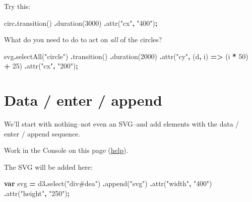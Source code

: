 \documentclass[
  openany]{book}
\newenvironment{Shaded}{\begin{snugshade}}{\end{snugshade}}
\newcommand{\DecValTok}[1]{\textcolor[rgb]{0.00,0.00,0.81}{#1}}
\newcommand{\FunctionTok}[1]{\textcolor[rgb]{0.00,0.00,0.00}{#1}}
\newcommand{\KeywordTok}[1]{\textcolor[rgb]{0.13,0.29,0.53}{\textbf{#1}}}
\newcommand{\NormalTok}[1]{#1}
\newcommand{\OperatorTok}[1]{\textcolor[rgb]{0.81,0.36,0.00}{\textbf{#1}}}
\newcommand{\StringTok}[1]{\textcolor[rgb]{0.31,0.60,0.02}{#1}}
\begin{document}
Try this:

\begin{Shaded}
\begin{Highlighting}[]
\NormalTok{circ}\OperatorTok{.}\FunctionTok{transition}\NormalTok{()}
  \OperatorTok{.}\FunctionTok{duration}\NormalTok{(}\DecValTok{3000}\NormalTok{)}
  \OperatorTok{.}\FunctionTok{attr}\NormalTok{(}\StringTok{"cx"}\OperatorTok{,} \StringTok{"400"}\NormalTok{)}\OperatorTok{;}
\end{Highlighting}
\end{Shaded}

What do you need to do to act on \emph{all} of the circles?

\begin{Shaded}
\begin{Highlighting}[]
\NormalTok{svg}\OperatorTok{.}\FunctionTok{selectAll}\NormalTok{(}\StringTok{"circle"}\NormalTok{)}
  \OperatorTok{.}\FunctionTok{transition}\NormalTok{()}
  \OperatorTok{.}\FunctionTok{duration}\NormalTok{(}\DecValTok{2000}\NormalTok{)}
  \OperatorTok{.}\FunctionTok{attr}\NormalTok{(}\StringTok{"cy"}\OperatorTok{,}\NormalTok{ (d}\OperatorTok{,}\NormalTok{ i) }\KeywordTok{=\textgreater{}}\NormalTok{ (i }\OperatorTok{*} \DecValTok{50}\NormalTok{) }\OperatorTok{+} \DecValTok{25}\NormalTok{)}
  \OperatorTok{.}\FunctionTok{attr}\NormalTok{(}\StringTok{"cx"}\OperatorTok{,} \StringTok{"200"}\NormalTok{)}\OperatorTok{;}
\end{Highlighting}
\end{Shaded}

\hypertarget{data-enter-append}{%
\section{\texorpdfstring{Data / enter / append }{Data / enter / append }}\label{data-enter-append}}

We'll start with nothing--not even an SVG--and add elements with the data / enter / append sequence.

Work in the Console on this page (\href{index.html\#this-book-console}{help}).

The SVG will be added here:

\hypertarget{dea}{}

\begin{Shaded}
\begin{Highlighting}[]
\KeywordTok{var}\NormalTok{ svg }\OperatorTok{=}\NormalTok{ d3}\OperatorTok{.}\FunctionTok{select}\NormalTok{(}\StringTok{"div\#dea"}\NormalTok{)}
  \OperatorTok{.}\FunctionTok{append}\NormalTok{(}\StringTok{"svg"}\NormalTok{)}
  \OperatorTok{.}\FunctionTok{attr}\NormalTok{(}\StringTok{"width"}\OperatorTok{,} \StringTok{"400"}\NormalTok{)}
  \OperatorTok{.}\FunctionTok{attr}\NormalTok{(}\StringTok{"height"}\OperatorTok{,} \StringTok{"250"}\NormalTok{)}\OperatorTok{;}
\end{Highlighting}
\end{Shaded}
\end{document}

